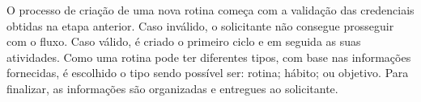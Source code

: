 \newpage
O processo de criação de uma nova rotina começa com a validação das credenciais obtidas
na etapa anterior. Caso inválido, o solicitante não consegue prosseguir com o fluxo.
Caso válido, é criado o primeiro ciclo e em seguida as suas atividades. Como uma
rotina pode ter diferentes tipos, com base nas informações fornecidas, é escolhido o tipo
sendo possível ser: rotina; hábito; ou objetivo. Para finalizar, as informações são
organizadas e entregues ao solicitante.
